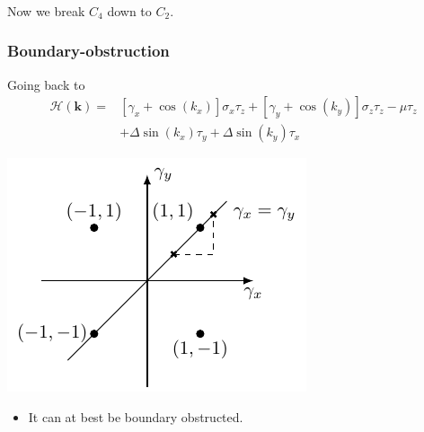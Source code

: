 \documentclass{beamer}
\newcommand{\mc}{\mathcal}
\renewcommand{\(}{\left(}
\renewcommand{\)}{\right)}
\renewcommand{\[}{\left[}
\renewcommand{\]}{\right]}
\begin{document}
\begin{frame}
    \frametitle{}

    \centering 
    Now we break $C_4$ down to $C_2$. 

\end{frame}

\begin{frame}
    \frametitle{Boundary-obstruction}

    Going back to
    \begin{align*}
        \mc H(\bm k) = &\[\gamma_x + \cos(k_x)\] \sigma_x \tau_z + \[\gamma_y + \cos(k_y)\] \sigma_z \tau_z -\mu \tau_z  \nonumber \\
        & + \Delta \sin(k_x) \tau_y + \Delta \sin(k_y) \tau_x 
    \end{align*}

    \begin{center}
        \includegraphics[]{simple_phase_diagram.pdf}
    \end{center}
    \begin{itemize}
        \item It can at best be boundary obstructed.
    \end{itemize} 
\end{frame}
\end{document}
